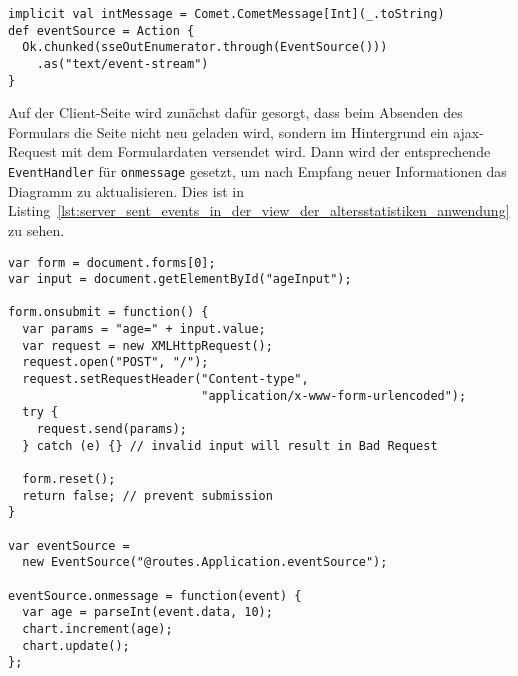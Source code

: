 \begin{lstlisting}[caption=Server Sent Events im Controller der Altersstatistiken-Anwendung, label=lst:server_sent_events_im_controller_der_altersstatistiken_anwendung]
implicit val intMessage = Comet.CometMessage[Int](_.toString)
def eventSource = Action {
  Ok.chunked(sseOutEnumerator.through(EventSource()))
    .as("text/event-stream")
}
\end{lstlisting}

Auf der Client-Seite wird zunächst dafür gesorgt, dass beim Absenden des Formulars die Seite nicht neu geladen wird, sondern im Hintergrund ein \gls{ajax}-Request mit dem Formulardaten versendet wird.
Dann wird der entsprechende \lstinline|EventHandler| für \lstinline|onmessage| gesetzt, um nach Empfang neuer Informationen das Diagramm zu aktualisieren.
Dies ist in Listing~\ref{lst:server_sent_events_in_der_view_der_altersstatistiken_anwendung} zu sehen.

\begin{lstlisting}[caption=Server Sent Events in der View der Altersstatistiken-Anwendung, label=lst:server_sent_events_in_der_view_der_altersstatistiken_anwendung]
var form = document.forms[0];
var input = document.getElementById("ageInput");

form.onsubmit = function() {
  var params = "age=" + input.value;
  var request = new XMLHttpRequest();
  request.open("POST", "/");
  request.setRequestHeader("Content-type",
                           "application/x-www-form-urlencoded");
  try {
    request.send(params);
  } catch (e) {} // invalid input will result in Bad Request

  form.reset();
  return false; // prevent submission
}

var eventSource =
  new EventSource("@routes.Application.eventSource");

eventSource.onmessage = function(event) {
  var age = parseInt(event.data, 10);
  chart.increment(age);
  chart.update();
};
\end{lstlisting}



